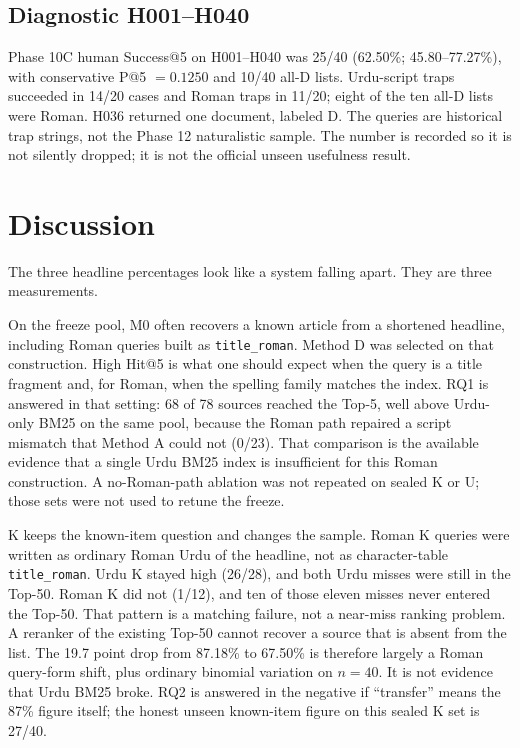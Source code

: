 \documentclass[10pt,letterpaper]{article}
\begin{document}
\subsection*{Diagnostic H001--H040}

Phase 10C human Success@5 on H001--H040 was 25/40 (62.50\%; 45.80--77.27\%), with conservative P@5 $= 0.1250$ and 10/40 all-D lists. Urdu-script traps succeeded in 14/20 cases and Roman traps in 11/20; eight of the ten all-D lists were Roman. H036 returned one document, labeled D. The queries are historical trap strings, not the Phase 12 naturalistic sample. The number is recorded so it is not silently dropped; it is not the official unseen usefulness result.

\section*{Discussion}
The three headline percentages look like a system falling apart. They are three measurements.

On the freeze pool, M0 often recovers a known article from a shortened headline, including Roman queries built as \texttt{title\_roman}. Method D was selected on that construction. High Hit@5 is what one should expect when the query is a title fragment and, for Roman, when the spelling family matches the index. RQ1 is answered in that setting: 68 of 78 sources reached the Top-5, well above Urdu-only BM25 on the same pool, because the Roman path repaired a script mismatch that Method A could not (0/23). That comparison is the available evidence that a single Urdu BM25 index is insufficient for this Roman construction. A no-Roman-path ablation was not repeated on sealed K or U; those sets were not used to retune the freeze.

K keeps the known-item question and changes the sample. Roman K queries were written as ordinary Roman Urdu of the headline, not as character-table \texttt{title\_roman}. Urdu K stayed high (26/28), and both Urdu misses were still in the Top-50. Roman K did not (1/12), and ten of those eleven misses never entered the Top-50. That pattern is a matching failure, not a near-miss ranking problem. A reranker of the existing Top-50 cannot recover a source that is absent from the list. The 19.7 point drop from 87.18\% to 67.50\% is therefore largely a Roman query-form shift, plus ordinary binomial variation on $n = 40$. It is not evidence that Urdu BM25 broke. RQ2 is answered in the negative if ``transfer'' means the 87\% figure itself; the honest unseen known-item figure on this sealed K set is 27/40.
\end{document}
